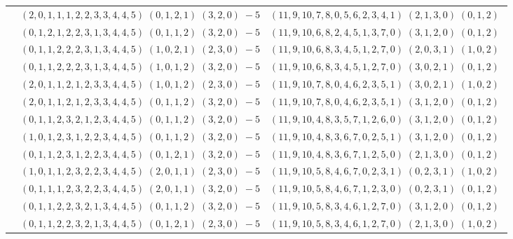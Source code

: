 \documentclass[11pt]{article}
\begin{document}
\begin{longtable}[l]{|c|c|c|}
 \cline{2-3} 
 & $(2 ,0 ,1 ,1 ,1 ,2 ,2 ,3 ,3 ,4 ,4 ,5) \;(0 ,1 ,2 ,1) \;(3 ,2 ,0) \;-5$ & $(11 ,9 ,10 ,7 ,8 ,0 ,5 ,6 ,2 ,3 ,4 ,1) \;(2 ,1 ,3 ,0) \;(0 ,1 ,2) \;$\\ 
 \cline{2-3} 
 & $(0 ,1 ,2 ,1 ,2 ,2 ,3 ,1 ,3 ,4 ,4 ,5) \;(0 ,1 ,1 ,2) \;(3 ,2 ,0) \;-5$ & $(11 ,9 ,10 ,6 ,8 ,2 ,4 ,5 ,1 ,3 ,7 ,0) \;(3 ,1 ,2 ,0) \;(0 ,1 ,2) \;$\\ 
 \cline{2-3} 
 & $(0 ,1 ,1 ,2 ,2 ,2 ,3 ,1 ,3 ,4 ,4 ,5) \;(1 ,0 ,2 ,1) \;(2 ,3 ,0) \;-5$ & $(11 ,9 ,10 ,6 ,8 ,3 ,4 ,5 ,1 ,2 ,7 ,0) \;(2 ,0 ,3 ,1) \;(1 ,0 ,2) \;$\\ 
 \cline{2-3} 
 & $(0 ,1 ,1 ,2 ,2 ,2 ,3 ,1 ,3 ,4 ,4 ,5) \;(1 ,0 ,1 ,2) \;(3 ,2 ,0) \;-5$ & $(11 ,9 ,10 ,6 ,8 ,3 ,4 ,5 ,1 ,2 ,7 ,0) \;(3 ,0 ,2 ,1) \;(0 ,1 ,2) \;$\\ 
 \cline{2-3} 
 & $(2 ,0 ,1 ,1 ,2 ,1 ,2 ,3 ,3 ,4 ,4 ,5) \;(1 ,0 ,1 ,2) \;(2 ,3 ,0) \;-5$ & $(11 ,9 ,10 ,7 ,8 ,0 ,4 ,6 ,2 ,3 ,5 ,1) \;(3 ,0 ,2 ,1) \;(1 ,0 ,2) \;$\\ 
 \cline{2-3} 
 & $(2 ,0 ,1 ,1 ,2 ,1 ,2 ,3 ,3 ,4 ,4 ,5) \;(0 ,1 ,1 ,2) \;(3 ,2 ,0) \;-5$ & $(11 ,9 ,10 ,7 ,8 ,0 ,4 ,6 ,2 ,3 ,5 ,1) \;(3 ,1 ,2 ,0) \;(0 ,1 ,2) \;$\\ 
 \cline{2-3} 
 & $(0 ,1 ,1 ,2 ,3 ,2 ,1 ,2 ,3 ,4 ,4 ,5) \;(0 ,1 ,1 ,2) \;(3 ,2 ,0) \;-5$ & $(11 ,9 ,10 ,4 ,8 ,3 ,5 ,7 ,1 ,2 ,6 ,0) \;(3 ,1 ,2 ,0) \;(0 ,1 ,2) \;$\\ 
 \cline{2-3} 
 & $(1 ,0 ,1 ,2 ,3 ,1 ,2 ,2 ,3 ,4 ,4 ,5) \;(0 ,1 ,1 ,2) \;(3 ,2 ,0) \;-5$ & $(11 ,9 ,10 ,4 ,8 ,3 ,6 ,7 ,0 ,2 ,5 ,1) \;(3 ,1 ,2 ,0) \;(0 ,1 ,2) \;$\\ 
 \cline{2-3} 
 & $(0 ,1 ,1 ,2 ,3 ,1 ,2 ,2 ,3 ,4 ,4 ,5) \;(0 ,1 ,2 ,1) \;(3 ,2 ,0) \;-5$ & $(11 ,9 ,10 ,4 ,8 ,3 ,6 ,7 ,1 ,2 ,5 ,0) \;(2 ,1 ,3 ,0) \;(0 ,1 ,2) \;$\\ 
 \cline{2-3} 
 & $(1 ,0 ,1 ,1 ,2 ,3 ,2 ,2 ,3 ,4 ,4 ,5) \;(2 ,0 ,1 ,1) \;(2 ,3 ,0) \;-5$ & $(11 ,9 ,10 ,5 ,8 ,4 ,6 ,7 ,0 ,2 ,3 ,1) \;(0 ,2 ,3 ,1) \;(1 ,0 ,2) \;$\\ 
 \cline{2-3} 
 & $(0 ,1 ,1 ,1 ,2 ,3 ,2 ,2 ,3 ,4 ,4 ,5) \;(2 ,0 ,1 ,1) \;(3 ,2 ,0) \;-5$ & $(11 ,9 ,10 ,5 ,8 ,4 ,6 ,7 ,1 ,2 ,3 ,0) \;(0 ,2 ,3 ,1) \;(0 ,1 ,2) \;$\\ 
 \cline{2-3} 
 & $(0 ,1 ,1 ,2 ,2 ,3 ,2 ,1 ,3 ,4 ,4 ,5) \;(0 ,1 ,1 ,2) \;(3 ,2 ,0) \;-5$ & $(11 ,9 ,10 ,5 ,8 ,3 ,4 ,6 ,1 ,2 ,7 ,0) \;(3 ,1 ,2 ,0) \;(0 ,1 ,2) \;$\\ 
 \cline{2-3} 
 & $(0 ,1 ,1 ,2 ,2 ,3 ,2 ,1 ,3 ,4 ,4 ,5) \;(0 ,1 ,2 ,1) \;(2 ,3 ,0) \;-5$ & $(11 ,9 ,10 ,5 ,8 ,3 ,4 ,6 ,1 ,2 ,7 ,0) \;(2 ,1 ,3 ,0) \;(1 ,0 ,2) \;$\\ 

\end{longtable}
\end{document}
